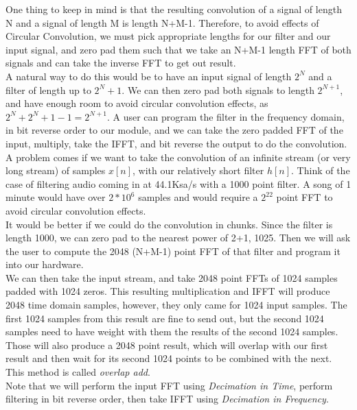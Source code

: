 \documentclass{article}
\begin{document}
One thing to keep in mind is that the resulting convolution of a signal of length N and a signal of length M is length N+M-1.
Therefore, to avoid effects of Circular Convolution, we must pick appropriate lengths for our filter and our input signal, and zero pad them
such that we take an N+M-1 length FFT of both signals and can take the inverse FFT to get out result. \\

A natural way to do this would be to have an input signal of length $2^{N}$ and a filter of length up to $2^{N}+1$.
We can then zero pad both signals to length $2^{N+1}$, and have enough room to avoid circular convolution effects,
as $2^{N} + 2^{N}+1 -1 = 2^{N+1}$. A user can program the filter in the frequency domain, in bit reverse order to our module, and we can take
the zero padded FFT of the input, multiply, take the IFFT, and bit reverse the output to do the convolution. \\

A problem comes if we want to take the convolution of an infinite stream (or very long stream) of samples $x[n]$, with our relatively short
filter $h[n]$. Think of the case of filtering audio coming in at 44.1Ksa/s with a 1000 point filter. A song of 1 minute would have over $2*10^{6}$
samples and would require a $2^{22}$ point FFT to avoid circular convolution effects. \\

It would be better if we could do the convolution in chunks. Since the filter is length 1000, we can zero pad to the nearest power of 2+1, 1025. Then we will ask
the user to compute the 2048 (N+M-1) point FFT of that filter and program it into our hardware. \\

We can then take the input stream, and take 2048 point FFTs of 1024 samples padded with 1024 zeros.
This resulting multiplication and IFFT will produce 2048 time domain samples, however, they only came for 1024 input samples.
The first 1024 samples from this result are fine to send out, but the second 1024 samples need to have weight with them the results of the second 1024 samples.
Those will also produce a 2048 point result, which will overlap with our first result and then wait for its second 1024 points to be combined with the next. \\

This method is called \emph{overlap add}. \\

Note that we will perform the input FFT using \emph{Decimation in Time}, perform filtering in bit reverse order, then take IFFT using
\emph{Decimation in Frequency}.
\end{document}
